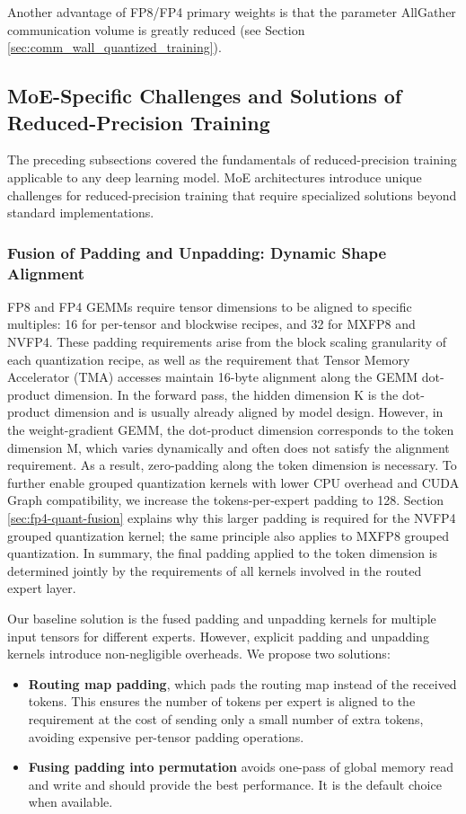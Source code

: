 Another advantage of FP8/FP4 primary weights is that the parameter AllGather communication volume is greatly reduced (see Section \ref{sec:comm_wall_quantized_training}).


\subsection{MoE-Specific Challenges and Solutions of Reduced-Precision Training}

The preceding subsections covered the fundamentals of reduced-precision training applicable to any deep learning model. MoE architectures introduce unique challenges for reduced-precision training that require specialized solutions beyond standard implementations.

\subsubsection{Fusion of Padding and Unpadding: Dynamic Shape Alignment}
FP8 and FP4 GEMMs require tensor dimensions to be aligned to specific multiples: 16 for per-tensor and blockwise recipes, and 32 for MXFP8 and NVFP4. These padding requirements arise from the block scaling granularity of each quantization recipe, as well as the requirement that Tensor Memory Accelerator (TMA) accesses maintain 16-byte alignment along the GEMM dot-product dimension. In the forward pass, the hidden dimension K is the dot-product dimension and is usually already aligned by model design. However, in the weight-gradient GEMM, the dot-product dimension corresponds to the token dimension M, which varies dynamically and often does not satisfy the alignment requirement. As a result, zero-padding along the token dimension is necessary. To further enable grouped quantization kernels with lower CPU overhead and CUDA Graph compatibility, we increase the tokens-per-expert padding to 128. Section \ref{sec:fp4-quant-fusion} explains why this larger padding is required for the NVFP4 grouped quantization kernel; the same principle also applies to MXFP8 grouped quantization. In summary, the final padding applied to the token dimension is determined jointly by the requirements of all kernels involved in the routed expert layer.

Our baseline solution is the fused padding and unpadding kernels for multiple input tensors for different experts. However, explicit padding and unpadding kernels introduce non-negligible overheads. We propose two solutions:
\begin{itemize}
    \item \textbf{Routing map padding}, which pads the routing map instead of the received tokens. This ensures the number of tokens per expert is aligned to the requirement at the cost of sending only a small number of extra tokens, avoiding expensive per-tensor padding operations.
    \item \textbf{Fusing padding into permutation} avoids one-pass of global memory read and write and should provide the best performance. It is the default choice when available.
\end{itemize}

